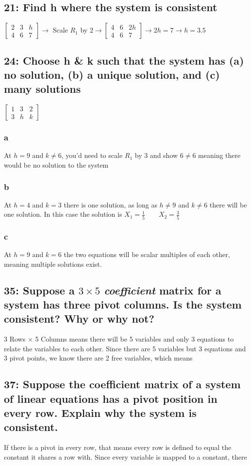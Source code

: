 \documentclass{article}
\begin{document}
\subsection*{21: Find h where the system is consistent}
$\left[\begin{array}{cc|c}
    2 & 3 & h \\
    4 & 6 & 7 
\end{array}\right] \rightarrow$ Scale $R_1$ by $2 \rightarrow
\left[\begin{array}{cc|c}
    4 & 6 & 2h \\
    4 & 6 & 7 
\end{array}\right] \rightarrow 2h=7 \rightarrow \boxed{h=3.5}
$
\subsection*{24: Choose h \& k such that the system has (a) no solution, (b) a unique solution, and (c) many solutions}
$\left[\begin{array}{cc|c}
    1 & 3 & 2 \\
    3 & h & k 
\end{array}\right]$
\subsubsection*{a}
At $h=9$ and $k\neq 6$, you'd need to scale $R_1$ by 3 and show $6\neq 6$ meaning there would be no solution to the system
\subsubsection*{b}
At $h=4$ and $k=3$ there is one solution, as long as $h \neq 9$ and $k \neq 6$ there will be one solution. In this case the solution is $X_1=\frac{1}{5} \qquad X_2 = \frac{3}{5}$
\subsubsection*{c}
At $h=9$ and $k=6$ the two equations will be scalar multiples of each other, meaning multiple solutions exist.
\subsection*{35: Suppose a $3\times 5$ \textit{coeﬃcient} matrix for a system has three pivot columns. Is the system consistent? Why or why not?}
3 Rows $\times$ 5 Columns means there will be 5 variables and only 3 equations to relate the variables to each other. Since there are 5 variables but 3 equations and 3 pivot points, we know there are 2 free variables, which means 
\subsection*{37: Suppose the coeﬃcient matrix of a system of linear equations has a pivot position in every row. Explain why the system is consistent.}
If there is a pivot in every row, that means every row is defined to equal the constant it shares a row with. Since every variable is mapped to a constant, there 
\end{document}
